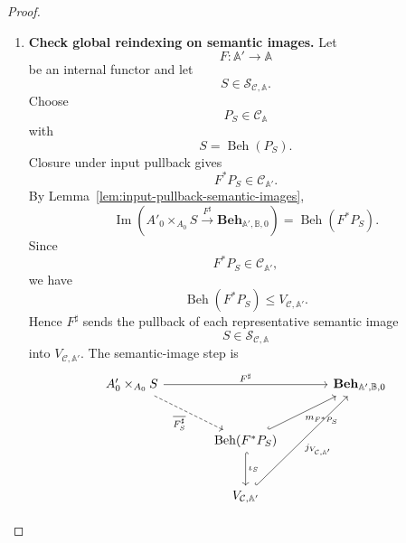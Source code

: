 \begin{proof}
\begin{enumerate}
        \item \textbf{Check global reindexing on semantic images.}
        Let
        \[
            F:\mathbb A'\to\mathbb A
        \]
        be an internal functor and let
        \[
            S\in\mathcal S_{\mathcal C,\mathbb A}.
        \]
        Choose
        \[
            P_S\in\mathcal C_{\mathbb A}
        \]
        with
        \[
            S=\operatorname{Beh}(P_S).
        \]
        Closure under input pullback gives
        \[
            F^*P_S\in\mathcal C_{\mathbb A'}.
        \]
        By Lemma~\ref{lem:input-pullback-semantic-images},
        \[
            \operatorname{Im}
            \left(
                A'_0\times_{A_0}S
                \xrightarrow{F^\sharp}
                \mathbf{Beh}_{\mathbb A',\mathbb B,0}
            \right)
            =
            \operatorname{Beh}(F^*P_S).
        \]
        Since
        \[
            F^*P_S\in\mathcal C_{\mathbb A'},
        \]
        we have
        \[
            \operatorname{Beh}(F^*P_S)
            \leq
            V_{\mathcal C,\mathbb A'}.
        \]
        Hence \(F^\sharp\) sends the pullback of each representative semantic
        image
        \[
            S\in\mathcal S_{\mathcal C,\mathbb A}
        \]
        into \(V_{\mathcal C,\mathbb A'}\). The semantic-image step is
\[
\begin{tikzcd}[column sep=large, row sep=large]
    A'_0\times_{A_0}S
        \arrow[rr, "F^\sharp"]
        \arrow[dr, dashed, "\overline{F^\sharp_S}"']
    &&
    \mathbf{Beh}_{\mathbb A',\mathbb B,0}
    \\
    &
    \operatorname{Beh}(F^*P_S)
        \arrow[ur, hook, "m_{F^*P_S}"']
        \arrow[d, hook, "\iota_S"]
    &
    \\
    &
    V_{\mathcal C,\mathbb A'}
        \arrow[uur, hook, "j_{V_{\mathcal C,\mathbb A'}}"']
    &
\end{tikzcd}
\]


\end{enumerate}
\end{proof}
